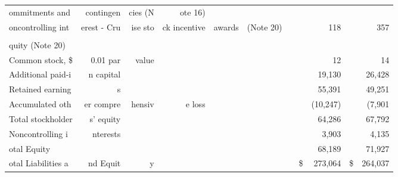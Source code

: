 \documentclass{article}
\begin{document}
\begin{table}[ht]
\begin{tabular}{lrrrrrrrrrr}
ommitments and & contingen & cies (N & ote 16) &  &  &  &  &  &  &  \\
oncontrolling int & erest - Cru & ise sto & ck incentive & awards & (Note 20) &  &  & 118 &  & 357 \\
 &  &  &  &  &  &  &  &  &  &  \\
quity (Note 20) &  &  &  &  &  &  &  &  &  &  \\
Common stock, \$ & 0.01 par & value &  &  &  &  &  & 12 &  & 14 \\
Additional paid-i & n capital &  &  &  &  &  &  & 19,130 &  & 26,428 \\
Retained earning & s &  &  &  &  &  &  & 55,391 &  & 49,251 \\
Accumulated oth & er compre & hensiv & e loss &  &  &  &  & (10,247) &  & (7,901 \\
Total stockholder & s’ equity &  &  &  &  &  &  & 64,286 &  & 67,792 \\
Noncontrolling i & nterests &  &  &  &  &  &  & 3,903 &  & 4,135 \\
otal Equity &  &  &  &  &  &  &  & 68,189 &  & 71,927 \\
otal Liabilities a & nd Equit & y &  &  &  &  & \$ & 273,064 & \$ & 264,037 \\
\bottomrule
\end{tabular}
\end{table}
\end{document}
